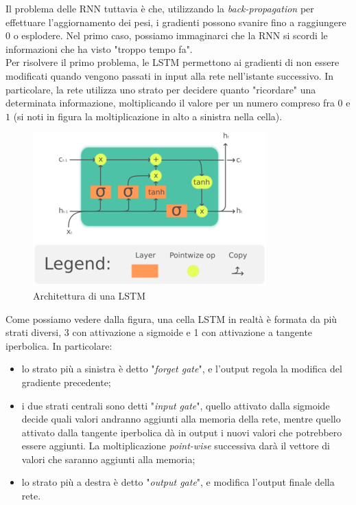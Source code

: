 \documentclass[8pt,notitlepage]{report}
\begin{document}
		Il problema delle RNN tuttavia è che, utilizzando la \textit{back-propagation} per effettuare l'aggiornamento dei pesi, i gradienti possono svanire fino a raggiungere $ 0 $ o esplodere. Nel primo caso, possiamo immaginarci che la RNN si scordi le informazioni che ha visto "troppo tempo fa". \\
		Per risolvere il primo problema, le LSTM permettono ai gradienti di non essere modificati quando vengono passati in input alla rete nell'istante successivo. In particolare, la rete utilizza uno strato per decidere quanto "ricordare" una determinata informazione, moltiplicando il valore per un numero compreso fra $ 0 $ e $ 1 $ (si noti in figura la moltiplicazione in alto a sinistra nella cella).
		
		\begin{figure}[H]
			\begin{center}
				\includegraphics[scale=2.2]{lstm}
				\caption{Architettura di una LSTM}
			\end{center}
		\end{figure}		
		
		Come possiamo vedere dalla figura, una cella LSTM in realtà è formata da più strati diversi, 3 con attivazione a sigmoide e 1 con attivazione a tangente iperbolica.
		In particolare:
		\begin{itemize}
			\item lo strato più a sinistra è detto "\textit{forget gate}", e l'output regola la modifica del gradiente precedente;
			\item i due strati centrali sono detti "\textit{input gate}", quello attivato dalla sigmoide decide quali valori andranno aggiunti alla memoria della rete, mentre quello attivato dalla tangente iperbolica dà in output i nuovi valori che potrebbero essere aggiunti. La moltiplicazione \textit{point-wise} successiva darà il vettore di valori che saranno aggiunti alla memoria; 
			\item lo strato più a destra è detto "\textit{output gate}", e modifica l'output finale della rete.
		\end{itemize}
		
\end{document}
